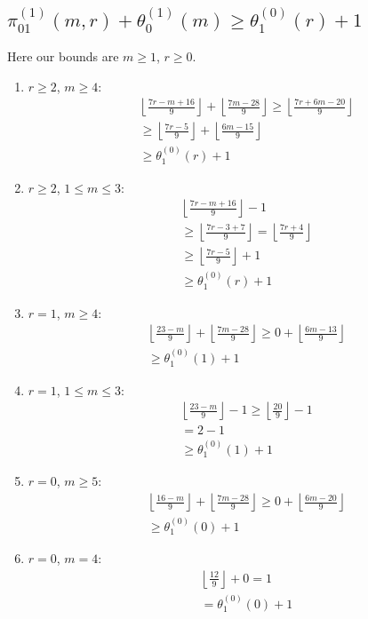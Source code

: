 \documentclass[reqno]{amsart}
\theoremstyle{definition}
\theoremstyle{remark}
\numberwithin{equation}{section}
\begin{document}
\subsection{$\displaystyle{\pi^{(1)}_{01}(m,r)+\theta^{(1)}_0(m)\ge \theta^{(0)}_1(r)+1}$}

Here our bounds are $m\ge 1$, $r\ge 0$.\\

\begin{enumerate}
\item $r\ge 2$, $m\ge 4$:
\begin{align*}
&\left\lfloor \frac{7r-m+16}{9} \right\rfloor + \left\lfloor \frac{7m-28}{9} \right\rfloor\ge\left\lfloor \frac{7r+6m-20}{9} \right\rfloor\\
&\ge\left\lfloor \frac{7r-5}{9} \right\rfloor + \left\lfloor \frac{6m-15}{9} \right\rfloor\\
&\ge\theta^{(0)}_1(r)+1
\end{align*}
\item $r\ge 2$, $1\le m\le 3$:
\begin{align*}
&\left\lfloor \frac{7r-m+16}{9} \right\rfloor -1\\
&\ge\left\lfloor \frac{7r-3+7}{9} \right\rfloor=\left\lfloor \frac{7r+4}{9} \right\rfloor\\
&\ge\left\lfloor \frac{7r-5}{9} \right\rfloor + 1\\
&\ge\theta^{(0)}_1(r)+1
\end{align*}
\item $r=1$, $m\ge 4$:
\begin{align*}
&\left\lfloor \frac{23-m}{9} \right\rfloor + \left\lfloor \frac{7m-28}{9} \right\rfloor\ge 0+\left\lfloor \frac{6m-13}{9} \right\rfloor\\
&\ge\theta^{(0)}_1(1)+1
\end{align*}
\item $r=1$, $1\le m\le 3$:
\begin{align*}
&\left\lfloor \frac{23-m}{9} \right\rfloor -1 \ge \left\lfloor \frac{20}{9} \right\rfloor - 1\\
&= 2-1\\
&\ge\theta^{(0)}_1(1)+1
\end{align*}
\item $r=0$, $m\ge 5$:
\begin{align*}
&\left\lfloor \frac{16-m}{9} \right\rfloor + \left\lfloor \frac{7m-28}{9} \right\rfloor\ge 0+\left\lfloor \frac{6m-20}{9} \right\rfloor\\
&\ge\theta^{(0)}_1(0)+1
\end{align*}
\item $r=0$, $m=4$:
\begin{align*}
&\left\lfloor \frac{12}{9} \right\rfloor + 0 = 1\\
&=\theta^{(0)}_1(0)+1
\end{align*}
\end{enumerate}
\end{document}
